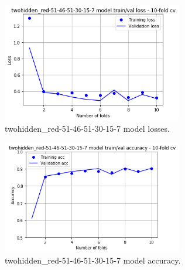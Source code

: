 \begin{figure} [H]
\centering
\includegraphics[width=0.7\textwidth]{./TeX_files/img/m2_auto_loss.png}
\caption{twohidden\_red-51-46-51-30-15-7 model losses.}
\label{fig:m2automodelloss}
\end{figure}

\begin{figure} [H]
\centering
\includegraphics[width=0.7\textwidth]{./TeX_files/img/m2_auto_acc.png}
\caption{twohidden\_red-51-46-51-30-15-7 model accuracy.}
\label{fig:m2automodelacc}
\end{figure}